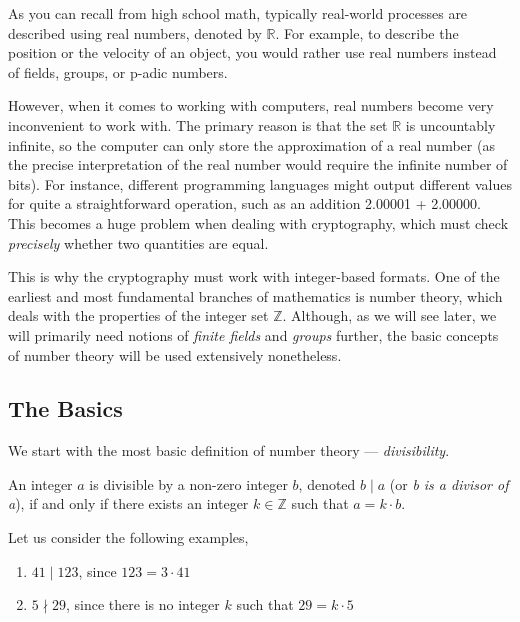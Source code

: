 \documentclass[../lecture-notes-148x210.tex]{subfiles}
\begin{document}
As you can recall from high school math, typically real-world processes are
described using real numbers, denoted by $\mathbb{R}$. For example, to describe
the position or the velocity of an object, you would rather use real numbers
instead of fields, groups, or p-adic numbers.

However, when it comes to working with computers, real numbers become very
inconvenient to work with. The primary reason is that the set $\mathbb{R}$ is
uncountably infinite, so the computer can only store the approximation of a real
number (as the precise interpretation of the real number would require the
infinite number of bits). For instance, different programming languages might
output different values for quite a straightforward operation, such as an
addition \textsf{2.00001 + 2.00000}. This becomes a huge problem when dealing
with cryptography, which must check \textit{precisely} whether two quantities
are equal.

This is why the cryptography must work with integer-based formats. One of the
earliest and most fundamental branches of mathematics is number theory, which
deals with the properties of the integer set $\mathbb{Z}$. Although, as we will
see later, we will primarily need notions of \emph{finite fields} and
\emph{groups} further, the basic concepts of number theory will be used
extensively nonetheless.

\subsection{The Basics}

We start with the most basic definition of number theory --- \emph{divisibility}.

\begin{definition}
    \label{def:divisibility}
    An integer $a$ is divisible by a non-zero integer $b$, denoted $b \mid a$ (or \emph{b is a divisor of a}), if and only if there exists an integer $k \in \mathbb{Z}$ such that $a = k \cdot b$.
\end{definition}

\begin{example} 
    \label{example:divisibility_1}
    Let us consider the following examples,
    \begin{enumerate}
        \item $41 \mid 123$, since $123 = 3 \cdot 41$
        \item $5 \nmid 29$, since there is no integer $k$ such that $29 = k \cdot 5$
    \end{enumerate}
\end{example}
\end{document}
